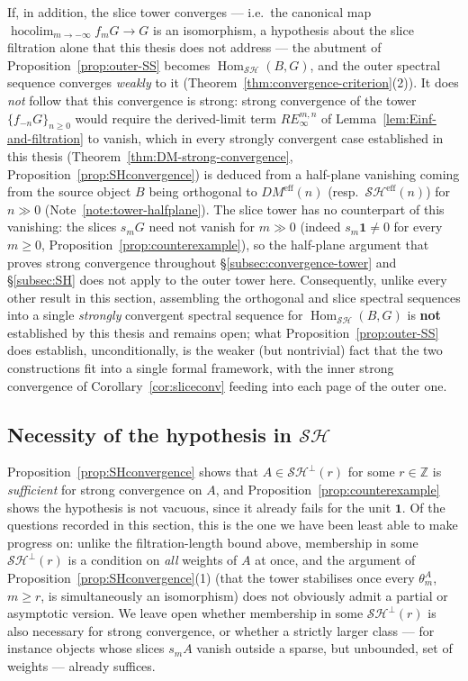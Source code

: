 \documentclass[12pt,a4paper]{article}
\theoremstyle{definition}
\newcommand{\SH}{\mathcal{SH}}
\newcommand{\hocolim}{\operatorname*{hocolim}}
\newcommand{\Hom}{\operatorname{Hom}}
\newcommand{\Z}{\mathbb{Z}}
\begin{document}
If, in addition, the slice tower converges — i.e.\ the canonical map
$\hocolim_{m\to-\infty}f_mG\to G$ is an isomorphism, a hypothesis about the
slice filtration alone that this thesis does not address — the abutment of
Proposition~\ref{prop:outer-SS} becomes $\Hom_{\SH}(B,G)$, and the outer
spectral sequence converges \emph{weakly} to it
(Theorem~\ref{thm:convergence-criterion}(2)).  It does \emph{not} follow
that this convergence is strong: strong convergence of the tower
$\{f_{-n}G\}_{n\geq 0}$ would require the derived-limit term
$RE_\infty^{m,n}$ of Lemma~\ref{lem:Einf-and-filtration} to vanish, which in
every strongly convergent case established in this thesis
(Theorem~\ref{thm:DM-strong-convergence}, Proposition~\ref{prop:SHconvergence})
is deduced from a half-plane vanishing coming from the source object $B$
being orthogonal to $DM^{\mathrm{eff}}(n)$ (resp.\ $\SH^{\mathrm{eff}}(n)$)
for $n\gg0$ (Note~\ref{note:tower-halfplane}).  The slice tower has no
counterpart of this vanishing: the slices $s_mG$ need not vanish for $m\gg0$
(indeed $s_m\mathbf 1\neq0$ for every $m\geq0$, Proposition~\ref{prop:counterexample}),
so the half-plane argument that proves strong convergence throughout
\S\ref{subsec:convergence-tower} and \S\ref{subsec:SH} does not apply to the
outer tower here.  Consequently, unlike every other result in this section,
assembling the orthogonal and slice spectral sequences into a single
\emph{strongly} convergent spectral sequence for $\Hom_{\SH}(B,G)$ is
\textbf{not} established by this thesis and remains open; what
Proposition~\ref{prop:outer-SS} does establish, unconditionally, is the
weaker (but nontrivial) fact that the two constructions fit into a single
formal framework, with the inner strong convergence of
Corollary~\ref{cor:sliceconv} feeding into each page of the outer one.

\subsection*{Necessity of the hypothesis in $\SH$}

Proposition~\ref{prop:SHconvergence} shows that $A\in\SH^\perp(r)$ for some
$r\in\Z$ is \emph{sufficient} for strong convergence on $A$, and
Proposition~\ref{prop:counterexample} shows the hypothesis is not vacuous,
since it already fails for the unit $\mathbf 1$.  Of the questions recorded
in this section, this is the one we have been least able to make progress
on: unlike the filtration-length bound above, membership in some
$\SH^\perp(r)$ is a condition on \emph{all} weights of $A$ at once, and the
argument of Proposition~\ref{prop:SHconvergence}(1) (that the tower
stabilises once every $\theta_m^A$, $m\geq r$, is simultaneously an
isomorphism) does not obviously admit a partial or asymptotic version.  We
leave open whether membership in some $\SH^\perp(r)$ is also necessary for
strong convergence, or whether a strictly larger class — for instance
objects whose slices $s_mA$ vanish outside a sparse, but unbounded, set of
weights — already suffices.
\end{document}

